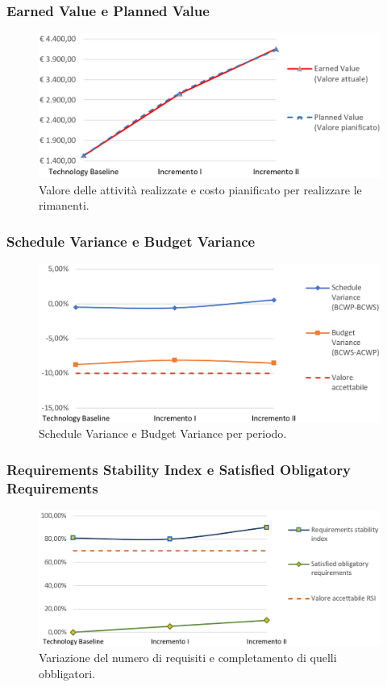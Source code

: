 \subsubsection{Earned Value e Planned Value}
\begin{figure}[h]
	\centering
	\includegraphics[width=16cm]{Images/EV-PV}
	\caption{Valore delle attività realizzate e costo pianificato per realizzare le rimanenti.}
\end{figure}

\newpage

\subsubsection{Schedule Variance e Budget Variance}
\begin{figure}[h]
	\centering
	\includegraphics[width=16cm]{Images/SV-BV}
	\caption{Schedule Variance e Budget Variance per periodo.}
\end{figure}



\subsubsection{Requirements Stability Index e Satisﬁed Obligatory Requirements}
\begin{figure}[h]
	\centering
	\includegraphics[width=16cm]{Images/requisiti}
	\caption{Variazione del numero di requisiti e completamento di quelli obbligatori.}
\end{figure}

